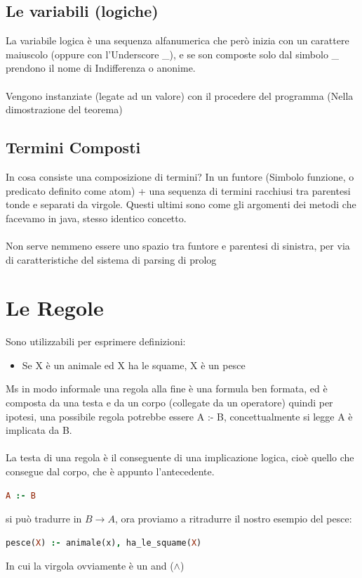 \documentclass[12pt, a4paper, openany, oneside]{book}
\begin{document}
\subsection{Le variabili (logiche)}
La variabile logica è una sequenza alfanumerica che però inizia con un carattere
maiuscolo (oppure con l'Underscore \_), e se son composte solo dal simbolo \_ 
prendono il nome di Indifferenza o anonime.
\\ \\
Vengono instanziate (legate ad un valore) con il procedere del programma 
(Nella dimostrazione del teorema)
\subsection{Termini Composti}
In cosa consiste una composizione di termini? In un \color{red} funtore
\color{black} (Simbolo funzione, o predicato definito come atom) +
una sequenza di termini racchiusi tra parentesi tonde e separati da virgole.
Questi ultimi sono come gli argomenti dei metodi che facevamo in java, stesso
identico concetto. \\ \\
Non serve nemmeno essere uno spazio tra funtore e parentesi di sinistra, per 
via di caratteristiche del sistema di parsing di prolog
\section{Le Regole}
Sono utilizzabili per esprimere definizioni:
\begin{itemize}
	\item Se X è un animale ed X ha le squame, X è un pesce
\end{itemize}
Ms in modo informale una regola alla fine è una formula ben formata, ed è composta
da una testa e da un corpo (collegate da un operatore) quindi per ipotesi, una 
possibile regola potrebbe essere A :- B, concettualmente si legge A è 
implicata da B.
\\ \\
La testa di una regola è il conseguente di una implicazione logica, cioè quello 
che consegue dal corpo, che è appunto l'antecedente.
\begin{lstlisting}[language = Prolog]
A :- B
\end{lstlisting} 
si può tradurre in $B \to A$, ora proviamo a ritradurre il nostro
esempio del pesce:
\begin{lstlisting}[language = Prolog]
pesce(X) :- animale(x), ha_le_squame(X)
\end{lstlisting} 
In cui la virgola ovviamente è un and ($\wedge$) \\ \\
\end{document}
